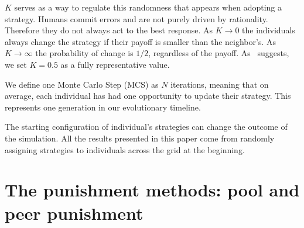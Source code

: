 $K$ serves as a way to regulate this randomness that appears when adopting a strategy. Humans commit errors and are not purely driven by rationality. Therefore they do not always act to the best response. As $K \to 0$ the individuals always change the strategy if their payoff is smaller than the neighbor's. As $K \to \infty$ the probability of change is $1/2$, regardless of the payoff. As~\cite{ValorK} suggests, we set $K=0.5$ as a fully representative value.

We define one Monte Carlo Step (MCS) as $N$ iterations, meaning that on average, each individual has had one opportunity to update their strategy. This represents one generation in our evolutionary timeline. 

The starting configuration of individual's strategies can change the outcome of the simulation. All the results presented in this paper come from randomly assigning strategies to individuals across the grid at the beginning. 




\section{The punishment methods: pool and peer punishment}
\label{3punish}



